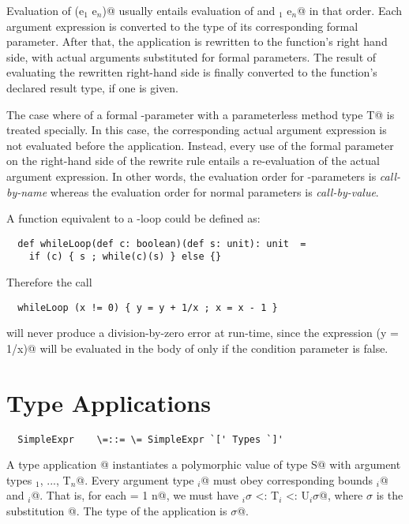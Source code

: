 \documentclass[11pt]{report}
\begin{document}

Evaluation of \verb@f(e$_1$ \commadots e$_n$)@ usually entails evaluation of
\verb@f@ and \verb@e$_1$ \commadots e$_n$@ in that order. Each argument expression
is converted to the type of its corresponding formal parameter.  After
that, the application is rewritten to the function's right hand side,
with actual arguments substituted for formal parameters.  The result
of evaluating the rewritten right-hand side is finally converted to
the function's declared result type, if one is given.

The case where of a formal \verb@def@-parameter with a parameterless
method type \verb@[]T@ is treated specially. In this case, the
corresponding actual argument expression is not evaluated before the
application. Instead, every use of the formal parameter on the
right-hand side of the rewrite rule entails a re-evaluation of the
actual argument expression. In other words, the evaluation order for
\verb@def@-parameters is {\em call-by-name} whereas the evaluation
order for normal parameters is {\em call-by-value}.

\example A function equivalent to a \verb@while@-loop could be defined as:

\begin{verbatim}
  def whileLoop(def c: boolean)(def s: unit): unit  =
    if (c) { s ; while(c)(s) } else {}
\end{verbatim}
Therefore the call
\begin{verbatim}
  whileLoop (x != 0) { y = y + 1/x ; x = x - 1 }
\end{verbatim}
will never produce a division-by-zero error at run-time, since the
expression \verb@(y = 1/x)@ will be evaluated in the body of
\verb@while@ only if the condition parameter is false.

\section{Type Applications}
\label{sec:type-app}
\syntax\begin{verbatim}
  SimpleExpr    \=::= \= SimpleExpr `[' Types `]'
\end{verbatim}

A type application \verb@f[T$_1$, ..., T$_n$]@ instantiates a
polymorphic value \verb@f@ of type
\verb@[a$_1$ >: L$_1$ <: U$_1$, ..., a$_n$ >: L$_n$ <: U$_n$]S@ with
argument types \verb@T$_1$, ..., T$_n$@.  Every argument type
\verb@T$_i$@ must obey corresponding bounds \verb@L$_i$@ and
\verb@U$_i$@.  That is, for each \verb@i = 1 \commadots n@, we must
have \verb@L$_i \sigma$ <: T$_i$ <: U$_i \sigma$@, where $\sigma$ is the
substitution \verb@[a$_1$ := T$_1$, ..., a$_n$ := T$_n$]@.  The type
of the application is \verb@S$\sigma$@.  
\end{document}
